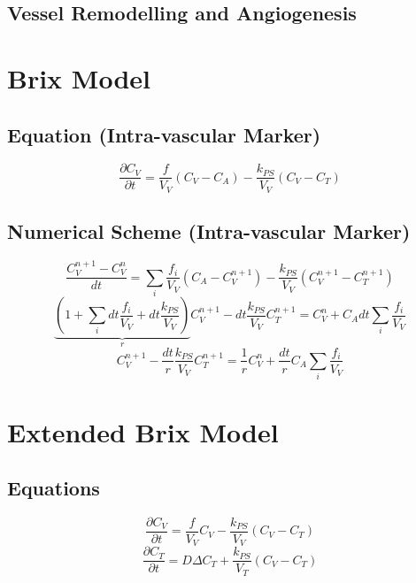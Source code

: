 \documentclass{article}
\begin{document}
\subsection{Vessel Remodelling and Angiogenesis}

\section{Brix Model}
\subsection{Equation (Intra-vascular Marker)}
\begin{equation}
	\frac{\partial C_V}{\partial t} = \frac{f}{V_V}(C_V - C_A) - \frac{k_{PS}}{V_V}(C_V - C_T)
\end{equation}

\subsection{Numerical Scheme (Intra-vascular Marker)}
\begin{equation}
	\frac{C_V^{n+1}-C_V^n}{dt} =  \sum_i \frac{f_i}{V_V} (C_A - C_{V}^{n+1}) - \frac{k_{PS}}{V_V}(C_V^{n+1} - C_T^{n+1})
\end{equation}
\begin{equation}
	\underbrace{\left(1 + \sum_i dt \frac{f_i}{V_V} + dt\frac{k_{PS}}{V_V}\right)}_{r} C_V^{n+1} - dt \frac{k_{PS}}{V_V}C_T^{n+1}
	= C_V^n + C_A dt \sum_i  \frac{f_i}{V_V} 
\end{equation}
\begin{equation}
	C_V^{n+1} - \frac{dt}{r} \frac{k_{PS}}{V_V}C_T^{n+1}
	= \frac{1}{r}C_V^n + \frac{dt}{r}C_A \sum_i  \frac{f_i}{V_V} 
\end{equation}


\section{Extended Brix Model}
\subsection{Equations}
\begin{equation}
	\frac{\partial C_V}{\partial t} = \frac{f}{V_V}C_V - \frac{k_{PS}}{V_V}(C_V - C_T)
\end{equation}
\begin{equation}
	\frac{\partial C_T}{\partial t} = D\Delta C_T + \frac{k_{PS}}{V_T}(C_V - C_T)
\end{equation}
\end{document}
